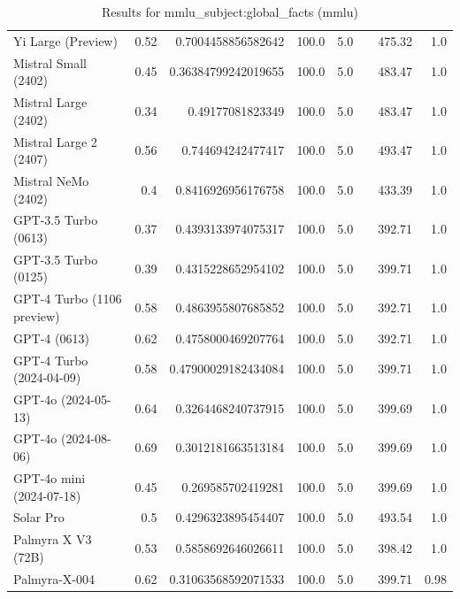 \begin{table}[htp]
{\begin{tabular}{lrrrrrrr}
Yi Large (Preview) & 0.52 & 0.7004458856582642 & 100.0 & 5.0 &  & 475.32 & 1.0 \\
Mistral Small (2402) & 0.45 & 0.36384799242019655 & 100.0 & 5.0 &  & 483.47 & 1.0 \\
Mistral Large (2402) & 0.34 & 0.49177081823349 & 100.0 & 5.0 &  & 483.47 & 1.0 \\
Mistral Large 2 (2407) & 0.56 & 0.744694242477417 & 100.0 & 5.0 &  & 493.47 & 1.0 \\
Mistral NeMo (2402) & 0.4 & 0.8416926956176758 & 100.0 & 5.0 &  & 433.39 & 1.0 \\
GPT-3.5 Turbo (0613) & 0.37 & 0.4393133974075317 & 100.0 & 5.0 &  & 392.71 & 1.0 \\
GPT-3.5 Turbo (0125) & 0.39 & 0.4315228652954102 & 100.0 & 5.0 &  & 399.71 & 1.0 \\
GPT-4 Turbo (1106 preview) & 0.58 & 0.4863955807685852 & 100.0 & 5.0 &  & 392.71 & 1.0 \\
GPT-4 (0613) & 0.62 & 0.4758000469207764 & 100.0 & 5.0 &  & 392.71 & 1.0 \\
GPT-4 Turbo (2024-04-09) & 0.58 & 0.47900029182434084 & 100.0 & 5.0 &  & 399.71 & 1.0 \\
GPT-4o (2024-05-13) & 0.64 & 0.3264468240737915 & 100.0 & 5.0 &  & 399.69 & 1.0 \\
GPT-4o (2024-08-06) & 0.69 & 0.3012181663513184 & 100.0 & 5.0 &  & 399.69 & 1.0 \\
GPT-4o mini (2024-07-18) & 0.45 & 0.269585702419281 & 100.0 & 5.0 &  & 399.69 & 1.0 \\
Solar Pro & 0.5 & 0.4296323895454407 & 100.0 & 5.0 &  & 493.54 & 1.0 \\
Palmyra X V3 (72B) & 0.53 & 0.5858692646026611 & 100.0 & 5.0 &  & 398.42 & 1.0 \\
Palmyra-X-004 & 0.62 & 0.31063568592071533 & 100.0 & 5.0 &  & 399.71 & 0.98 \\
\bottomrule
\end{tabular}}
\caption{Results for mmlu_subject:global_facts (mmlu)}
\label{fig:mmlu_subject:global_facts (mmlu)}
\end{table}